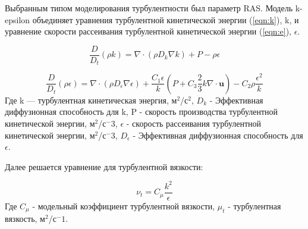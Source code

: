 \documentclass[14pt,a4paper]{article}
\begin{document}
%        
%        
%        
        
        Выбранным типом моделирования турбулентности был параметр RAS. Модель k-epsilon объединяет уравнения турбулентной кинетической энергии (\ref{eqn:k}), k, и уравнение скорости рассеивания турбулентной кинетической энергии (\ref{eqn:e}), $\epsilon$.
        
        \begin{equation}\label{eqn:k}
            \frac{D}{D_{t}}(\rho k) = \nabla \cdot (\rho D_{k}\nabla k) + P - \rho\epsilon
        \end{equation} 
        
        \begin{equation}\label{eqn:e}
            \frac{D}{D_{t}}(\rho\epsilon) = \nabla \cdot (\rho D_{\epsilon}\nabla\epsilon) + \frac{C_{1}\epsilon}{k}(P + C_{3}\frac{2}{3}k\nabla \cdot \bm{u}) - C_{2}\rho\frac{\epsilon^2}{k}
        \end{equation} 
       Где k --- турбулентная кинетическая энергия, м$^2$/с$^2$, $D_{k}$ - Эффективная диффузионная способность для k, P - скорость производства турбулентной кинетической энергии, м$^2$/с$^-3$, $\epsilon$ - скорость рассеивания турбулентной кинетической энергии, м$^2$/с$^-3$, $D_{\epsilon}$ - Эффективная диффузионная способность для $\epsilon$.
               
        Далее решается уравнение для турбулентной вязкости:
        
        \begin{equation}\label{eqn:mu}
           \nu_{t} = C_{\mu}\frac{k^2}{\epsilon}
        \end{equation} 
        Где $C_{\mu}$ - модельный коэффициент турбулентной вязкости, $\mu_{t}$ - турбулентная вязкость, м$^2$/с$^-1$.
        
\end{document}
